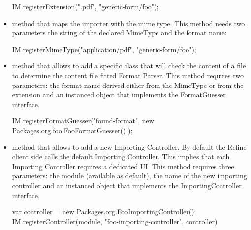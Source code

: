 \begin{itemize}
\begin{code}
IM.registerExtension(".pdf", "generic-form/foo");
	\end{code}
	\item {} method that maps the importer with the mime type. This method needs two parameters the string of the declared MimeType and the format name:
	\begin{code}
IM.registerMimeType("application/pdf", "generic-form/foo");
	\end{code}
	\item {} method that allows to add a specific class that will check the content of a file to determine the content file fitted Format Parser. This method requires two parameters: the format name derived either from the MimeType or from the extension and an instanced object that implements the FormatGuesser interface.
	\begin{code}
IM.registerFormatGuesser("found-format",
   new Packages.org.foo.FooFormatGuesser() );
	\end{code}	
	\item {} method that allows to add a new Importing Controller. By default the Refine client side calls the default Importing Controller. This implies that each Importing Controller requires a dedicated UI. This method requires three parameters: the module (available as default), the name of the new importing controller and an instanced object that implements the ImportingController interface.
	\begin{code}
var controller = new Packages.org.FooImportingController();
IM.registerController(module,
                      "foo-importing-controller", 
                      controller)
	\end{code}
\end{itemize}

